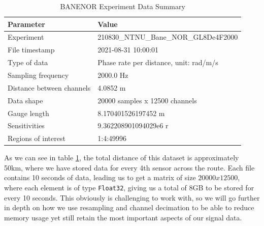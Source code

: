 \begin{table}[h]
    \centering
    \begin{tabular}{|l|l|}
        \hline
        \textbf{Parameter} & \textbf{Value} \\
        \hline
        Experiment & 210830\_NTNU\_Bane\_NOR\_GL8De4F2000 \\
        \hline
        File timestamp & 2021-08-31 10:00:01 \\
        \hline
        Type of data & Phase rate per distance, unit: rad/m/s \\
        \hline
        Sampling frequency & 2000.0 Hz \\
        \hline
        Distance between channels & 4.0852 m \\
        \hline
        Data shape & 20000 samples x 12500 channels \\
        \hline
        Gauge length & 8.170401526197452 m \\
        \hline
        Sensitivities & 9.362208901094029e6 r \\
        \hline
        Regions of interest & 1:4:49996 \\
        \hline
    \end{tabular}
    \caption{BANENOR Experiment Data Summary}
    \label{tab:experiment_data}
\end{table}

As we can see in table \ref{tab:experiment_data}, the total distance of this dataset is approximately 50km, where we have stored data for every 4th sensor across the route. Each file contains 10 seconds of data, leading us to get a matrix of size $20000 x 12500$, where each element is of type \texttt{Float32}, giving us a total of 8GB to be stored for every 10 seconds. This obviously is challenging to work with, so we will go further in depth on how we use resampling and channel decimation to be able to reduce memory usage yet still retain the most important aspects of our signal data. \\

